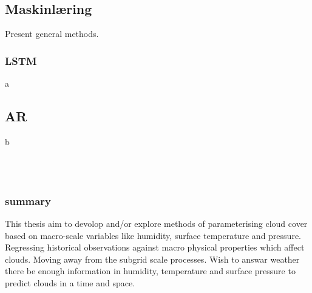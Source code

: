 \\ \\
\subsection{Maskinlæring}
Present general methods.

\subsubsection{LSTM}
a

\subsection{AR}
b




\\ \\ 
\subsubsection{summary}
This thesis aim to devolop and/or explore methods of parameterising cloud cover based on macro-scale variables like humidity, surface temperature and pressure. Regressing historical observations against macro physical properties which affect clouds. Moving away from the subgrid scale processes. Wish to answar weather there be enough information in humidity, temperature and surface pressure to predict clouds in a time and space.




